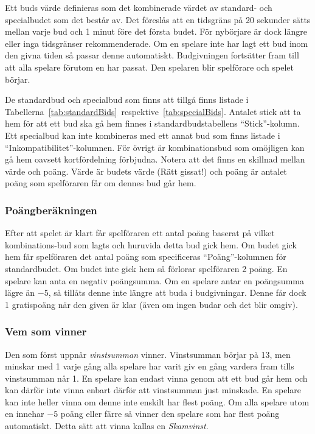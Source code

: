 \documentclass[a4paper]{article}
\begin{document}
				Ett buds värde definieras som det kombinerade värdet av standard- och specialbudet som det består av. Det föreslås att en tidsgräns på 20 sekunder sätts mellan varje bud och 1 minut före det första budet. För nybörjare är dock längre eller inga tidsgränser rekommenderade. Om en spelare inte har lagt ett bud inom den givna tiden så passar denne automatiskt. Budgivningen fortsätter fram till att alla spelare förutom en har passat. Den spelaren blir spelförare och spelet börjar.

				De standardbud och specialbud som finns att tillgå finns listade i Tabellerna~\ref{tab:standardBids}~respektive~\ref{tab:specialBids}. Antalet stick att ta hem för att ett bud ska gå hem finnes i standardbudstabellens ``Stick''-kolumn. Ett specialbud kan inte kombineras med ett annat bud som finns listade i ``Inkompatibilitet''-kolumnen. För övrigt är kombinationsbud som omöjligen kan gå hem oavsett kortfördelning förbjudna. Notera att det finns en skillnad mellan värde och poäng. Värde är budets värde (Rätt gissat!) och poäng är antalet poäng som spelföraren får om dennes bud går hem.

			\subsubsection{Poängberäkningen}
				Efter att spelet är klart får spelföraren ett antal poäng baserat på vilket kombinations-bud som lagts och huruvida detta bud gick hem. Om budet gick hem får spelföraren det antal poäng som specificeras ``Poäng''-kolumnen för standardbudet. Om budet inte gick hem så förlorar spelföraren 2 poäng. En spelare kan anta en negativ poängsumma. Om en spelare antar en poängsumma lägre än $-5$, så tillåts denne inte längre att buda i budgivningar. Denne får dock 1 gratispoäng när den given är klar (även om ingen budar och det blir omgiv).

			\subsubsection{Vem som vinner}
				\label{sec:winning}
				Den som först uppnår \emph{vinstsumman} vinner. Vinstsumman börjar på 13, men minskar med 1 varje gång alla spelare har varit giv en gång vardera fram tills vinstsumman når 1. En spelare kan endast vinna genom att ett bud går hem och kan därför inte vinna enbart därför att vinstsumman just minskade. En spelare kan inte heller vinna om denne inte enskilt har flest poäng. Om alla spelare utom en innehar $-5$ poäng eller färre så vinner den spelare som har flest poäng automatiskt. Detta sätt att vinna kallas en \emph{Skamvinst}.
\end{document}
